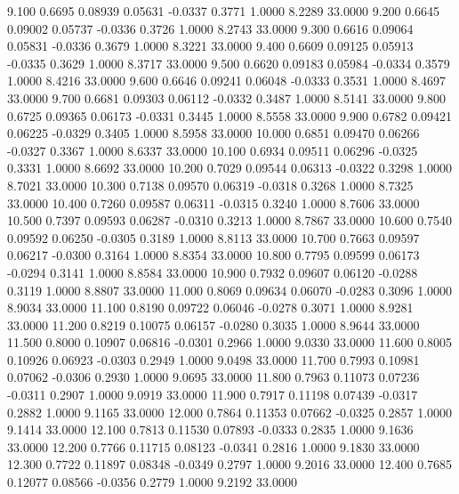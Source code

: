    9.100   0.6695   0.08939   0.05631  -0.0337   0.3771   1.0000   8.2289  33.0000
   9.200   0.6645   0.09002   0.05737  -0.0336   0.3726   1.0000   8.2743  33.0000
   9.300   0.6616   0.09064   0.05831  -0.0336   0.3679   1.0000   8.3221  33.0000
   9.400   0.6609   0.09125   0.05913  -0.0335   0.3629   1.0000   8.3717  33.0000
   9.500   0.6620   0.09183   0.05984  -0.0334   0.3579   1.0000   8.4216  33.0000
   9.600   0.6646   0.09241   0.06048  -0.0333   0.3531   1.0000   8.4697  33.0000
   9.700   0.6681   0.09303   0.06112  -0.0332   0.3487   1.0000   8.5141  33.0000
   9.800   0.6725   0.09365   0.06173  -0.0331   0.3445   1.0000   8.5558  33.0000
   9.900   0.6782   0.09421   0.06225  -0.0329   0.3405   1.0000   8.5958  33.0000
  10.000   0.6851   0.09470   0.06266  -0.0327   0.3367   1.0000   8.6337  33.0000
  10.100   0.6934   0.09511   0.06296  -0.0325   0.3331   1.0000   8.6692  33.0000
  10.200   0.7029   0.09544   0.06313  -0.0322   0.3298   1.0000   8.7021  33.0000
  10.300   0.7138   0.09570   0.06319  -0.0318   0.3268   1.0000   8.7325  33.0000
  10.400   0.7260   0.09587   0.06311  -0.0315   0.3240   1.0000   8.7606  33.0000
  10.500   0.7397   0.09593   0.06287  -0.0310   0.3213   1.0000   8.7867  33.0000
  10.600   0.7540   0.09592   0.06250  -0.0305   0.3189   1.0000   8.8113  33.0000
  10.700   0.7663   0.09597   0.06217  -0.0300   0.3164   1.0000   8.8354  33.0000
  10.800   0.7795   0.09599   0.06173  -0.0294   0.3141   1.0000   8.8584  33.0000
  10.900   0.7932   0.09607   0.06120  -0.0288   0.3119   1.0000   8.8807  33.0000
  11.000   0.8069   0.09634   0.06070  -0.0283   0.3096   1.0000   8.9034  33.0000
  11.100   0.8190   0.09722   0.06046  -0.0278   0.3071   1.0000   8.9281  33.0000
  11.200   0.8219   0.10075   0.06157  -0.0280   0.3035   1.0000   8.9644  33.0000
  11.500   0.8000   0.10907   0.06816  -0.0301   0.2966   1.0000   9.0330  33.0000
  11.600   0.8005   0.10926   0.06923  -0.0303   0.2949   1.0000   9.0498  33.0000
  11.700   0.7993   0.10981   0.07062  -0.0306   0.2930   1.0000   9.0695  33.0000
  11.800   0.7963   0.11073   0.07236  -0.0311   0.2907   1.0000   9.0919  33.0000
  11.900   0.7917   0.11198   0.07439  -0.0317   0.2882   1.0000   9.1165  33.0000
  12.000   0.7864   0.11353   0.07662  -0.0325   0.2857   1.0000   9.1414  33.0000
  12.100   0.7813   0.11530   0.07893  -0.0333   0.2835   1.0000   9.1636  33.0000
  12.200   0.7766   0.11715   0.08123  -0.0341   0.2816   1.0000   9.1830  33.0000
  12.300   0.7722   0.11897   0.08348  -0.0349   0.2797   1.0000   9.2016  33.0000
  12.400   0.7685   0.12077   0.08566  -0.0356   0.2779   1.0000   9.2192  33.0000
